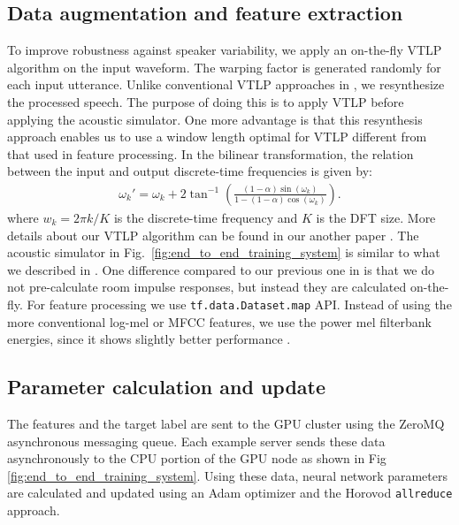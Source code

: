 \documentclass[a4paper]{article}
\begin{document}
\subsection{Data augmentation and feature extraction}
\label{sec:feature_extraction}
To improve robustness against speaker variability, we apply an
on-the-fly VTLP algorithm on the input waveform. The warping
factor is generated randomly for each input utterance. Unlike
conventional VTLP approaches in \cite{x_cui_taslp_2015_00,
n_jaitly_icml_workshop_2013_00}, we resynthesize the processed
speech. The purpose of doing this is to apply VTLP before applying
the acoustic simulator. One more advantage is that this
resynthesis approach enables us to use a window length 
optimal for VTLP different from that used in feature processing.
In the bilinear transformation, the relation between the input
and output discrete-time frequencies is given by: 
\begin{align}
  \omega_k'  = \omega_k + 2 \tan^{-1} \left(
                    \frac{ \left(1 - \alpha \right) \sin(\omega_k)} 
              {1 - (1 - \alpha) \cos(\omega_k) } \right)
                            \label{eq:bilinear_transformation}.
\end{align}
where $w_k= {2 \pi k}/{K}$ is the discrete-time frequency
 and $K$ is the DFT size. 
More details about our VTLP algorithm can be found
in our another paper \cite{c_kim_interspeech_2019_00}.
The acoustic simulator in Fig.~\ref{fig:end_to_end_training_system}
is similar to what we described in 
\cite{C_Kim_INTERSPEECH_2017_1, c_kim_interspeech_2018_00}.
One difference compared to our previous one in 
\cite{C_Kim_INTERSPEECH_2017_1} is that we do not pre-calculate
room impulse responses, but instead they are calculated on-the-fly.
For feature processing we use {\tt tf.data.Dataset.map} API. 
Instead of using the more conventional log-mel or 
MFCC features, we use the power mel filterbank energies,
since it shows slightly better performance \cite{c_kim_interspeech_2019_01}.

\subsection{Parameter calculation and update}
The features and the target label are sent to the GPU cluster
using the ZeroMQ \cite{zero_mq} asynchronous messaging queue.
Each example server sends these data asynchronously to the CPU portion
of the GPU node as shown in Fig \ref{fig:end_to_end_training_system}.
Using these data, neural network parameters are calculated and updated 
using an Adam optimizer and the
Horovod \cite{a_sergeev_arxiv_2018_00} {\tt allreduce} approach.
\end{document}
